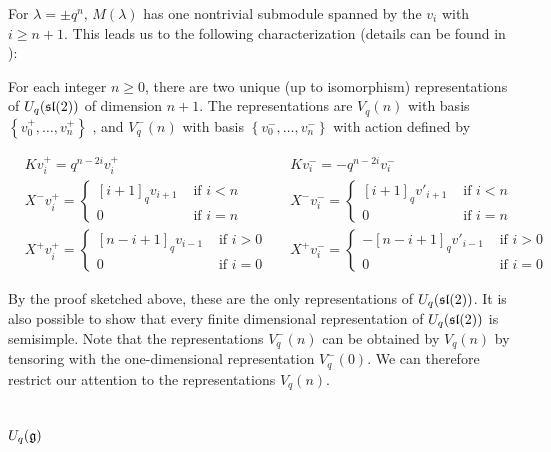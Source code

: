 For $\lambda = \pm q^{n}$, $M(\lambda)$ has one nontrivial submodule spanned by the $v_i$ with $i \geq n+1$.
This leads us to the following characterization (details can be found in \cite{Jantzen1996}):


For each integer $n \geq 0$, there are two unique (up to isomorphism)
representations of $U_q(\mathfrak{sl}(2))$ of dimension $n+1$. 
The representations are $V_q(n)$ with basis $\left\{ v^+_0, \ldots, v^+_n
\right\}$ , and $V_q^-(n)$ with basis $\left\{ v^-_0, \ldots, v^-_n \right\}$
with action defined by 

\begin{align*}
    &K v^+_i = q^{n-2i} v^+_i  &
    &K v^-_i = -q^{n-2i} v^-_i \\
    &X^- v^+_i = \begin{cases} [i+1]_qv_{i+1}& \text{ if $i < n$} \\ 0& \text{ if $i = n$} \end{cases} &
    &X^- v^-_i = \begin{cases} [i+1]_qv'_{i+1}& \text{ if $i < n$} \\ 0& \text{ if $i = n$} \end{cases} \\
    & X^+  v^+_i = \begin{cases} 
                     [n-i+1]_qv_{i-1}& \text{ if $i > 0$} \\ 
                    0& \text{ if $i = 0$} 
             \end{cases} &
    & X^+  v^-_i = \begin{cases} 
                    -[n-i+1]_q v'_{i-1}& \text{ if $i > 0$} \\ 
                    0& \text{ if $i = 0$} 
             \end{cases}
\end{align*}

By the proof sketched above, these are the only representations of
$U_q(\mathfrak{sl}(2))$. It is also possible to show that every finite dimensional
representation of $U_q(\mathfrak{sl}(2))$ is semisimple.  Note that the representations
$V_q^-(n)$ can be obtained by $V_q(n)$ by tensoring with the one-dimensional
representation $V_q^-(0)$. We can therefore restrict our attention to the
representations $V_q(n)$.


\section{$U_q(\mathfrak{g})$}
\label{U_q(g)}

